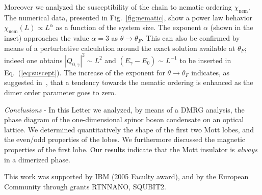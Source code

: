\documentclass[prl,twocolumn,superscriptaddress,showpacs,floatfix]{revtex4}
\begin{document}
Moreover we analyzed the 
susceptibility of the chain to nematic ordering $\chi_{\mathrm{nem}}$.
The numerical data, presented in Fig.~\ref{fig:nematic},
show a power law behavior $\chi_{\mathrm{nem}} (L) \propto L^\alpha$
as a function of the system size.
The exponent $\alpha$ (shown in the inset) approaches the value 
$\alpha=3$ as $\theta \to \theta_F$. This can also be confirmed by means of
a perturbative calculation around the exact solution available at $\theta_F$;
indeed one obtains $\left| Q_{0,\gamma} \right|^{2} \sim L^{2}$ and
$(E_\gamma - E_0) \sim L^{-1}$ to be inserted in Eq.~(\ref{eq:suscept}).
The increase of the exponent for $\theta \to \theta _F$ indicates, as suggested
in~\cite{porras05}, that a tendency towards the nematic ordering is enhanced as
the dimer order parameter goes to zero.

{\em Conclusions } - In this Letter we analyzed, by means of a DMRG analysis,
the phase diagram of the one-dimensional spinor boson condensate on an
optical lattice.
We determined quantitatively the shape of the first two Mott lobes,
and the even/odd properties of the lobes. We furthermore discussed the 
magnetic properties of the first lobe. Our results indicate that the
Mott insulator is {\em always} in a dimerized phase. 

This work was  supported by IBM (2005 Faculty award), and by the European 
Community through grants RTNNANO, SQUBIT2.
\end{document}
